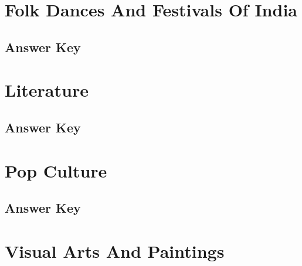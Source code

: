 \documentclass[12pt,a4paper]{book}
\newcounter{totalcounter}
\begin{document}


\setcounter{totalcounter}{1}

\section{Folk Dances And Festivals Of India}



\subsection*{Answer Key}



\setcounter{totalcounter}{1}

\section{Literature}



\subsection*{Answer Key}



\setcounter{totalcounter}{1}

\section{Pop Culture}



\subsection*{Answer Key}



\setcounter{totalcounter}{1}

\section{Visual Arts And Paintings}


\end{document}

